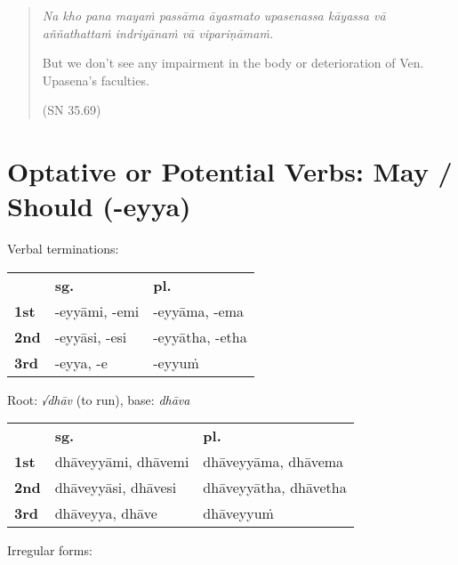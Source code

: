 \documentclass[11pt,oneside]{memoir}
\begin{document}
\normalArrayStrech

\begin{quote}
\emph{Na kho pana mayaṁ passāma āyasmato upasenassa kāyassa vā aññathattaṁ indriyānaṁ vā vipariṇāmaṁ.}

But we don't see any impairment in the body or deterioration of Ven. Upasena's faculties.

(SN 35.69)
\end{quote}

\section{Optative or Potential Verbs: May / Should (-eyya)}
\label{sec:orgf6a1f15}

{\centering\par
\begin{multicols}{2}

Verbal terminations:

\begin{center}
\begin{tabular}{lll}
 & \textbf{sg.} & \textbf{pl.}\\[0pt]
\textbf{1st} & -eyyāmi, -emi & -eyyāma, -ema\\[0pt]
\textbf{2nd} & -eyyāsi, -esi & -eyyātha, -etha\\[0pt]
\textbf{3rd} & -eyya, -e & -eyyuṁ\\[0pt]
\end{tabular}
\end{center}

\columnbreak

Root: \emph{√dhāv} (to run), base: \emph{dhāva}

\begin{center}
\begin{tabular}{lll}
 & \textbf{sg.} & \textbf{pl.}\\[0pt]
\textbf{1st} & dhāveyyāmi, dhāvemi & dhāveyyāma, dhāvema\\[0pt]
\textbf{2nd} & dhāveyyāsi, dhāvesi & dhāveyyātha, dhāvetha\\[0pt]
\textbf{3rd} & dhāveyya, dhāve & dhāveyyuṁ\\[0pt]
\end{tabular}
\end{center}

\end{multicols}
\par}

Irregular forms:
\end{document}
